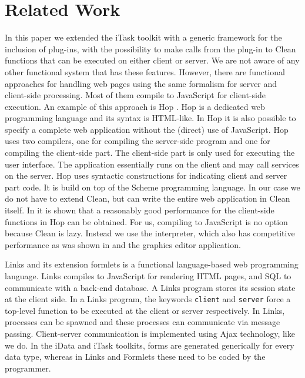 \section{Related Work}\label{sapljs:sec:related}
In this paper we extended the \textsf{iTask} toolkit with a generic framework for the inclusion of plug-ins, with the possibility to make calls from the plug-in to  \textsf{Clean} functions that can be executed on either client or server. 
We are not aware of any other functional system that has these features. 
However, there are functional approaches for handling web pages using the same formalism for server and client-side processing. Most of them compile to \textsf{JavaScript} for  client-side execution. 
An example of this approach is \textsf{Hop} \cite{HOP1,HOP2}. \textsf{Hop} is a dedicated web programming language and its syntax is \textsf{HTML}-like. In \textsf{Hop} it is also possible to specify a complete web application without the (direct) use of \textsf{JavaScript}. \textsf{Hop} uses two compilers, one for compiling the server-side program and one for compiling the client-side part. The client-side part is only used for executing the user interface. The application essentially runs on the client and may call services on the server. \textsf{Hop} uses syntactic constructions for indicating client and server part code. It is build on top of the Scheme programming language. In our case we do not have to extend \textsf{Clean}, but can write the entire web application in \textsf{Clean} itself. 
In \cite{HOP2} it is shown that a reasonably good performance for the client-side functions in \textsf{Hop} can be obtained. For us, compiling to \textsf{JavaScript} is no option because \textsf{Clean} is lazy. Instead we use the \Sapl interpreter, which also has competitive performance as was shown in \cite{JKP} and the graphics editor application.

\textsf{Links} \cite{LINKS1} and its extension \textsf{formlets}  is a functional language-based web programming language. \textsf{Links} compiles to \textsf{JavaScript} for rendering \textsf{HTML} pages, and SQL to communicate with a back-end database. A \textsf{Links} program stores its session state at the client side. In a Links program, the keywords \texttt{client} and \texttt{server} force a top-level function to be executed at the client or server respectively. In \textsf{Links}, processes can be spawned and these processes can communicate via message passing. Client-server communication is implemented using \textsf{Ajax} technology, like we do. 
In the \textsf{iData} and \textsf{iTask} toolkits, forms are generated generically for every data type, whereas in \textsf{Links} and \textsf{Formlets} these need to be coded by the programmer. 

